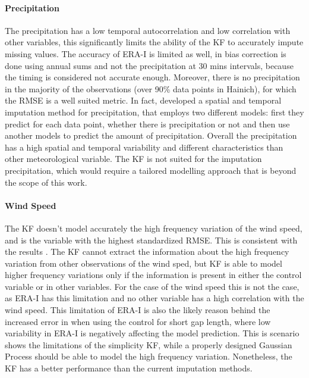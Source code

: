 \documentclass{article}
\begin{document}
\paragraph{Precipitation} The precipitation has a low temporal autocorrelation and low correlation with other variables, this significantly limits the ability of the KF to accurately impute missing values. The accuracy of ERA-I is limited as well, in  bias correction is done using annual sums and not the precipitation at 30 mins intervals, because the timing is considered not accurate enough. Moreover, there is no precipitation in the majority of the observations (over 90\% data points in Hainich), for which the RMSE is a well suited metric. In fact, \cite{chivers_imputation_2020} developed a spatial and temporal imputation method for precipitation, that employs two different models: first they predict for each data point, whether there is precipitation or not and then use another models to predict the amount of precipitation.  Overall the precipitation has a high spatial and temporal variability \cite{mital_sequential_2020} and different characteristics  than other meteorological variable. The KF is not suited for the imputation precipitation, which would require a tailored modelling approach that is beyond the scope of this work.

\paragraph{Wind Speed} The KF doesn't model accurately the high frequency variation of the wind speed, and is the variable with the highest standardized RMSE. This is consistent with the results \cite{vuichard_filling_2015}. The KF cannot extract the information about the high frequency variation from other observations of the wind sped, but KF is able to model higher frequency variations only if the information is present in either the control variable or in other variables. For the case of the wind speed this is not the case, as ERA-I has this limitation and no other variable has a high correlation with the wind speed. This limitation of ERA-I is also the likely reason behind the increased error in  when using the control for short gap length, where low variability in ERA-I is negatively affecting the model prediction.
This is scenario shows the limitations of the simplicity KF, while a properly designed Gaussian Process should be able to model the high frequency variation. Nonetheless, the KF has a better performance than the current imputation methods. 
\end{document}
